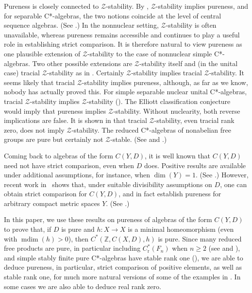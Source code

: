 \documentclass[10pt]{amsart}
\numberwithin{equation}{section}
\theoremstyle{definition}
\newcommand{\Z}{{\mathbb{Z}}}
\newcommand{\mdim}{{\operatorname{mdim}}}
\newcommand{\cZ}{{\mathcal{Z}}}
\newcommand{\ca}{C*-algebra}
\newcommand{\mh}{minimal homeomorphism}
\begin{document}
Pureness is closely connected to $\cZ$-stability.
By \cite{Rord2004}, $\cZ$-stability implies pureness, and for separable C*-algebras, the two notions coincide at the level of central sequence algebras.
(See \cite{PerThiVil2025}.)
In the nonnuclear setting, $\cZ$-stability is often unavailable, whereas pureness remains accessible and continues to play a useful role in establishing strict comparison.
It is therefore natural to view pureness as one plausible extension of $\cZ$-stability to the case of nonnuclear simple \ca{s}.
Two other possible extensions are $\cZ$-stability itself and (in the unital case)
tracial $\cZ$-stability as in \cite[Definition~2.1]{HirOr}.
Certainly $\cZ$-stability implies tracial $\cZ$-stability.
It seems likely that tracial $\cZ$-stability implies
pureness, although, as far as we know, nobody has
actually proved this.
For simple separable nuclear
unital \ca{s}, tracial $\cZ$-stability implies
$\cZ$-stability (\cite[Theorem~4.1]{HirOr}).
The Elliott classification conjecture would imply that
pureness implies $\cZ$-stability.
Without nuclearity,
both reverse implications are false.
It is shown in
\cite[Theorem 2.2]{NiuWng} that tracial $\cZ$-stability, even
tracial rank zero, does not imply $\cZ$-stability.
The
reduced \ca{s} of nonabelian free groups are pure but
certainly not $\cZ$-stable.
(See \cite[Theorem A]{AGKEP} and
\cite[Proposition 5.13]{AnPrTlVt}.)

Coming back to algebras of the form $C(Y, D)$, it is well known that $C(Y, D)$ need not have strict comparison, even when $D$ does.
Positive results are available under additional assumptions, for instance, when $\dim(Y)=1$.
(See \cite[Theorem 2.6]{AnBoPe}.)
However, recent work in~\cite{SethVil} shows that, under suitable divisibility assumptions on $D$, one can obtain strict comparison for $C(Y, D)$, and in fact establish pureness for arbitrary compact metric spaces $Y$.
(See  \cite[Corollary 5.9 and Theorem 5.11]{SethVil}.)

In this paper, we use these results on pureness of algebras
of the form $C (Y, D)$ to prove that,
if $D$  is pure and $h \colon X \to X$ is a \mh{} (even with
$\mdim (h) > 0$), then $C^* (\Z, C (X, D), h)$
is pure.
Since many reduced free products are pure, in
particular including $C^*_{\mathrm{r}} (F_n)$ when
$n \geq 2$ (see \cite[Theorem A]{AGKEP} and
\cite[Proposition 5.13]{AnPrTlVt}), and simple stably finite
pure \ca{s} have stable rank one (\cite[Corallary 1.3]{HLin}), we are
able to deduce pureness, in particular, strict comparison of
positive elements, as well as stable rank one, for much
more natural versions of some of the examples in
\cite[Section~6]{ArBcPh2}.
In some cases we are also
able to deduce real rank zero.
\end{document}
